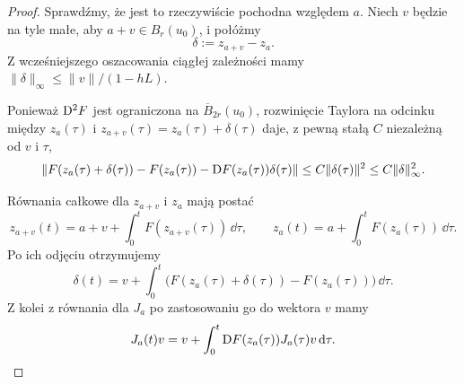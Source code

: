 \begin{proof}
Sprawdźmy, że jest to rzeczywiście pochodna względem $a$.
Niech $v$ będzie na tyle małe, aby $a+v\in B_r(u_0)$, i połóżmy
\[
\delta:=z_{a+v}-z_a.
\]
Z wcześniejszego oszacowania ciągłej zależności mamy
$\|\delta\|_\infty\leq \|v\|/(1-hL)$.

Ponieważ $\mathrm D^2F$ jest ograniczona na $\overline B_{2r}(u_0)$,
rozwinięcie Taylora na odcinku między $z_a(\tau)$ i
$z_{a+v}(\tau)=z_a(\tau)+\delta(\tau)$ daje, z pewną stałą
$C$ niezależną od $v$ i $\tau$,
\[
\|F(z_a(\tau)+\delta(\tau))-F(z_a(\tau))
      -\mathrm D F(z_a(\tau))\delta(\tau)\|
\leq C\|\delta(\tau)\|^2
\leq C\|\delta\|_\infty^2.
\]

Równania całkowe dla $z_{a+v}$ i $z_a$ mają postać
\[
z_{a+v}(t)=a+v+\int_0^t F(z_{a+v}(\tau))\,\dd\tau,
\qquad
z_a(t)=a+\int_0^t F(z_a(\tau))\,\dd\tau.
\]
Po ich odjęciu otrzymujemy
\[
\delta(t)
=
v+\int_0^t
\bigl(F(z_a(\tau)+\delta(\tau))-F(z_a(\tau))\bigr)\,\dd\tau.
\]
Z kolei z równania dla $J_a$ po zastosowaniu go do wektora $v$ mamy
\[
J_a(t)v
=
v+\int_0^t \mathrm D F(z_a(\tau))J_a(\tau)v\,\mathrm d\tau.
\]


\end{proof}
